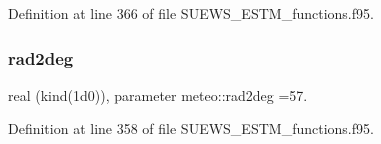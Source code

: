 Definition at line 366 of file S\+U\+E\+W\+S\+\_\+\+E\+S\+T\+M\+\_\+functions.\+f95.

\mbox{\label{namespacemeteo_ae4e33b320117dc89986bd1d37a18ae74}} 
\subsubsection{\texorpdfstring{rad2deg}{rad2deg}}
{\footnotesize\ttfamily real (kind(1d0)), parameter meteo\+::rad2deg =57.}



Definition at line 358 of file S\+U\+E\+W\+S\+\_\+\+E\+S\+T\+M\+\_\+functions.\+f95.

